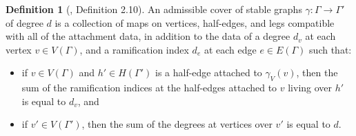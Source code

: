 \documentclass[thesis]{thesis-umich}           %
\theoremstyle{definition}
\newtheorem{dfn}[thm]{Definition}
\begin{document}
\begin{dfn}[\cite{Lian}, Definition 2.10]
  An admissible cover of stable graphs $\gamma:\Gamma\to\Gamma'$
  of degree $d$ is a collection of maps on vertices, half-edges, and
  legs compatible with all of the attachment
  data, in addition to the data of a degree
  $d_v$ at each vertex $v\in V(\Gamma)$,
  and a ramification index $d_e$ at each
  edge $e\in E(\Gamma)$ such that:
  \begin{itemize}
  \item if $v\in V(\Gamma)$ and $h'\in H(\Gamma')$
    is a half-edge attached to $\gamma_V(v)$, then
    the sum of the ramification indices
    at the half-edges attached to $v$ living
    over $h'$ is equal to $d_v$, and
  \item
    if $v'\in V(\Gamma')$, then the sum
    of the degrees at vertices over $v'$ is
    equal to $d$.
    \end{itemize}
\end{dfn}
\end{document}
